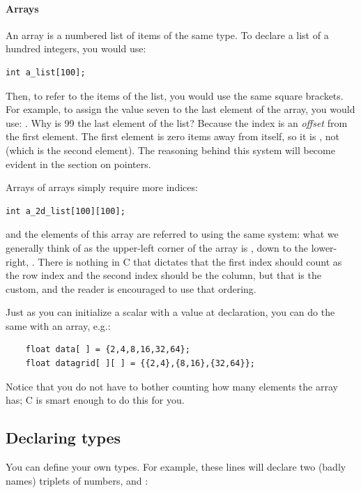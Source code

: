 \documentclass[12pt]{article}
\makeatletter
\def\ind#1{\index{#1}#1}
\def\ttindex#1{\index{#1@\cinline{#1}}}
\makeatother
\begin{document}
\paragraph{Arrays} An \ind{array} is a numbered list of items of the same type. To declare a list of a hundred
integers, you would use:
\begin{lstlisting}
int a_list[100];
\end{lstlisting}
Then, to refer to the items of the list, you would use the same square
brackets. For example, to assign the value seven to the last element
of the array, you would use: . Why is 99 the last
element of the list? Because the index is an {\sl offset} from the first
element. The first element is zero items away from itself, so it is
, not  (which is the second element).
The reasoning behind this system will become evident in the section
on pointers.

Arrays of arrays simply require more indices:\\
\begin{lstlisting}
int a_2d_list[100][100];
\end{lstlisting}
and the elements of this array are referred to using the same system: what we generally think of as the
upper-left corner of the array is , down to the
lower-right, . There is nothing in C that
dictates that the first index should count as the row index and the
second index should be the column, but that is the custom, and the
reader is encouraged to use that ordering.

Just as you can initialize a scalar with a value at declaration, you can
do the same with an array, e.g.:
\begin{lstlisting}
    float data[ ] = {2,4,8,16,32,64};
    float datagrid[ ][ ] = {{2,4},{8,16},{32,64}};
\end{lstlisting}
Notice that you do not have to bother counting how many elements the
array has; C is smart enough to do this for you.

\subsection{Declaring types}\ttindex{typedef}  
You can define your own
types. For example, these lines will declare two (badly names) triplets
of numbers,  and :
\end{document}
